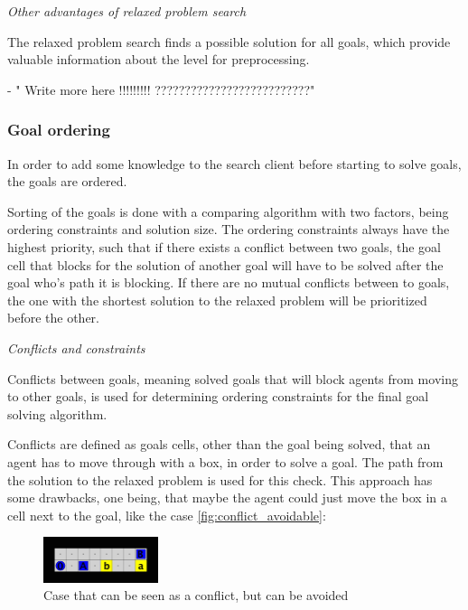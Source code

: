 \documentclass[Main]{subfiles}
\begin{document}
\textit{Other advantages of relaxed problem search}

The relaxed problem search finds a possible solution for all goals, which provide valuable information about the level for preprocessing. 




- " Write more here !!!!!!!!! ??????????????????????????"



\subsubsection{Goal ordering}

In order to add some knowledge to the search client before starting to solve goals, the goals are ordered. 

Sorting of the goals is done with a comparing algorithm with two factors, being ordering constraints and solution size. The ordering constraints always have the highest priority, such that if there exists a conflict between two goals, the goal cell that blocks for the solution of another goal will have to be solved after the goal who's path it is blocking. If there are no mutual conflicts between to goals, the one with the shortest solution to the relaxed problem will be prioritized before the other. 


\textit{Conflicts and constraints}

Conflicts between goals, meaning solved goals that will block agents from moving to other goals, is used for determining ordering constraints for the final goal solving algorithm. 

Conflicts are defined as goals cells, other than the goal being solved, that an agent has to move through with a box, in order to solve a goal. The path from the solution to the relaxed problem is used for this check. This approach has some drawbacks, one being, that maybe the agent could just move the box in a cell next to the goal, like the case \autoref{fig:conflict_avoidable}:
\begin{figure}[h!]
    \centering
    \includegraphics[width=0.3\textwidth]{conflict.png}
    \caption{Case that can be seen as a conflict, but can be avoided}
    \label{fig:conflict_avoidable}
\end{figure}
\end{document}
